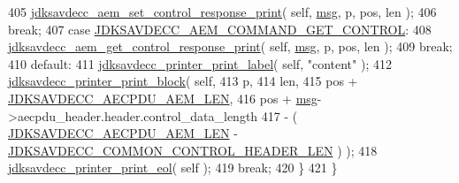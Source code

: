 \begin{DoxyCode}
405         \hyperlink{group__aem__print_ga8ed15b2b67bfa68a7f5bebbdddc305f6}{jdksavdecc\_aem\_set\_control\_response\_print}( \textcolor{keyword}{self}, 
      \hyperlink{maap__log__linux_8c_a0c7e58a50354c4a4d6dad428d0e47029}{msg}, p, pos, len );
406         \textcolor{keywordflow}{break};
407     \textcolor{keywordflow}{case} \hyperlink{group__command_ga5e5b22c644bac1a44abfda29f55bad47}{JDKSAVDECC\_AEM\_COMMAND\_GET\_CONTROL}:
408         \hyperlink{group__aem__print_gae342e36984fb0fa396b4a2192413e260}{jdksavdecc\_aem\_get\_control\_response\_print}( \textcolor{keyword}{self}, 
      \hyperlink{maap__log__linux_8c_a0c7e58a50354c4a4d6dad428d0e47029}{msg}, p, pos, len );
409         \textcolor{keywordflow}{break};
410     \textcolor{keywordflow}{default}:
411         \hyperlink{group__util_gaf7818b24143b3c7502926a425a242ff5}{jdksavdecc\_printer\_print\_label}( \textcolor{keyword}{self}, \textcolor{stringliteral}{"content"} );
412         \hyperlink{group__util_ga18d7b11e396f21996dedde77febcb22f}{jdksavdecc\_printer\_print\_block}( \textcolor{keyword}{self},
413                                         p,
414                                         len,
415                                         pos + \hyperlink{group__aecpdu__aem_ga225c1b8a460f2631846dee37713da1bc}{JDKSAVDECC\_AECPDU\_AEM\_LEN},
416                                         pos + \hyperlink{maap__log__linux_8c_a0c7e58a50354c4a4d6dad428d0e47029}{msg}->aecpdu\_header.header.control\_data\_length
417                                         - ( \hyperlink{group__aecpdu__aem_ga225c1b8a460f2631846dee37713da1bc}{JDKSAVDECC\_AECPDU\_AEM\_LEN} - 
      \hyperlink{group__jdksavdecc__avtp__common__control__header_gaae84052886fb1bb42f3bc5f85b741dff}{JDKSAVDECC\_COMMON\_CONTROL\_HEADER\_LEN} ) );
418         \hyperlink{group__util_gacda56c9d3d24593a52c999682fa6e6e3}{jdksavdecc\_printer\_print\_eol}( \textcolor{keyword}{self} );
419         \textcolor{keywordflow}{break};
420     \}
421 \}
\end{DoxyCode}


